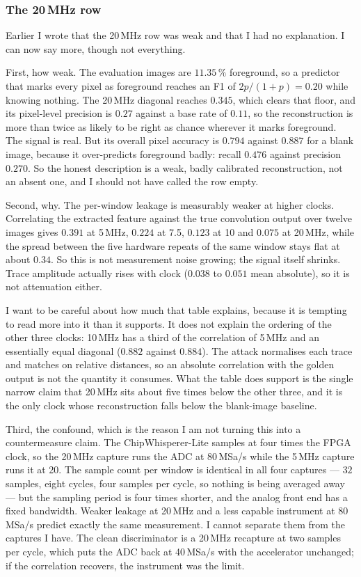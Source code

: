 \documentclass[11pt,a4paper]{article}
\begin{document}
\subsubsection*{The 20\,MHz row}

Earlier I wrote that the 20\,MHz row was weak and that I had no explanation. I can now say
more, though not everything.

First, how weak. The evaluation images are $11.35\,\%$ foreground, so a predictor that
marks every pixel as foreground reaches an F1 of $2p/(1+p) = 0.20$ while knowing nothing.
The 20\,MHz diagonal reaches $0.345$, which clears that floor, and its pixel-level
precision is $0.27$ against a base rate of $0.11$, so the reconstruction is more than twice
as likely to be right as chance wherever it marks foreground. The signal is real. But its
overall pixel accuracy is $0.794$ against $0.887$ for a blank image, because it
over-predicts foreground badly: recall $0.476$ against precision $0.270$. So the honest
description is a weak, badly calibrated reconstruction, not an absent one, and I should not
have called the row empty.

Second, why. The per-window leakage is measurably weaker at higher clocks. Correlating the
extracted feature against the true convolution output over twelve images gives $0.391$ at
5\,MHz, $0.224$ at 7.5, $0.123$ at 10 and $0.075$ at 20\,MHz, while the spread between the
five hardware repeats of the same window stays flat at about $0.34$. So this is not
measurement noise growing; the signal itself shrinks. Trace amplitude actually rises with
clock ($0.038$ to $0.051$ mean absolute), so it is not attenuation either.

I want to be careful about how much that table explains, because it is tempting to read
more into it than it supports. It does not explain the ordering of the other three clocks:
10\,MHz has a third of the correlation of 5\,MHz and an essentially equal diagonal
($0.882$ against $0.884$). The attack normalises each trace and matches on relative
distances, so an absolute correlation with the golden output is not the quantity it
consumes. What the table does support is the single narrow claim that 20\,MHz sits about
five times below the other three, and it is the only clock whose reconstruction falls below
the blank-image baseline.

Third, the confound, which is the reason I am not turning this into a countermeasure claim.
The ChipWhisperer-Lite samples at four times the FPGA clock, so the 20\,MHz capture runs the
ADC at 80\,MSa/s while the 5\,MHz capture runs it at 20. The sample count per window is
identical in all four captures --- $32$ samples, eight cycles, four samples per cycle, so
nothing is being averaged away --- but the sampling period is four times shorter, and the
analog front end has a fixed bandwidth. Weaker leakage at 20\,MHz and a less capable
instrument at 80\,MSa/s predict exactly the same measurement. I cannot separate them from
the captures I have. The clean discriminator is a 20\,MHz recapture at two samples per
cycle, which puts the ADC back at 40\,MSa/s with the accelerator unchanged; if the
correlation recovers, the instrument was the limit.
\end{document}
